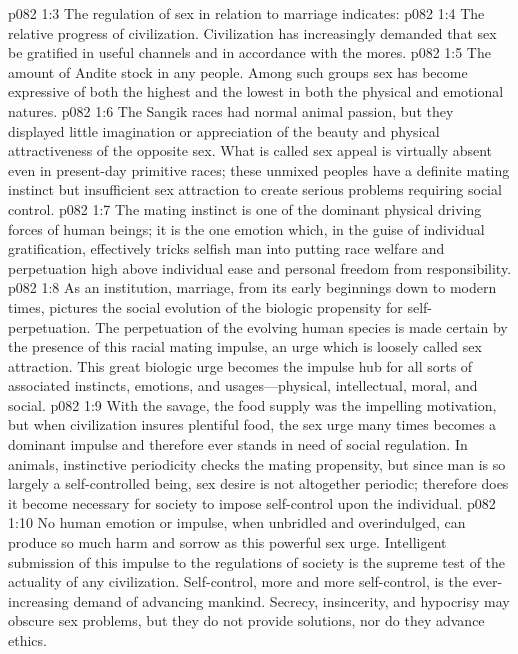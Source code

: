 \pc \vs p082 1:3 The regulation of sex in relation to marriage indicates:
\pc \vs p082 1:4 \bibnobreakspace The relative progress of civilization. Civilization has increasingly demanded that sex be gratified in useful channels and in accordance with the mores.
\pc \vs p082 1:5 \bibnobreakspace The amount of Andite stock in any people. Among such groups sex has become expressive of both the highest and the lowest in both the physical and emotional natures.
\pc \vs p082 1:6 The Sangik races had normal animal passion, but they displayed little imagination or appreciation of the beauty and physical attractiveness of the opposite sex. What is called sex appeal is virtually absent even in present\hyp{}day primitive races; these unmixed peoples have a definite mating instinct but insufficient sex attraction to create serious problems requiring social control.
\vs p082 1:7 The mating instinct is one of the dominant physical driving forces of human beings; it is the one emotion which, in the guise of individual gratification, effectively tricks selfish man into putting race welfare and perpetuation high above individual ease and personal freedom from responsibility.
\vs p082 1:8 As an institution, marriage, from its early beginnings down to modern times, pictures the social evolution of the biologic propensity for self\hyp{}perpetuation. The perpetuation of the evolving human species is made certain by the presence of this racial mating impulse, an urge which is loosely called sex attraction. This great biologic urge becomes the impulse hub for all sorts of associated instincts, emotions, and usages---physical, intellectual, moral, and social.
\vs p082 1:9 With the savage, the food supply was the impelling motivation, but when civilization insures plentiful food, the sex urge many times becomes a dominant impulse and therefore ever stands in need of social regulation. In animals, instinctive periodicity checks the mating propensity, but since man is so largely a self\hyp{}controlled being, sex desire is not altogether periodic; therefore does it become necessary for society to impose self\hyp{}control upon the individual.
\vs p082 1:10 No human emotion or impulse, when unbridled and overindulged, can produce so much harm and sorrow as this powerful sex urge. Intelligent submission of this impulse to the regulations of society is the supreme test of the actuality of any civilization. Self\hyp{}control, more and more self\hyp{}control, is the ever\hyp{}increasing demand of advancing mankind. Secrecy, insincerity, and hypocrisy may obscure sex problems, but they do not provide solutions, nor do they advance ethics.
